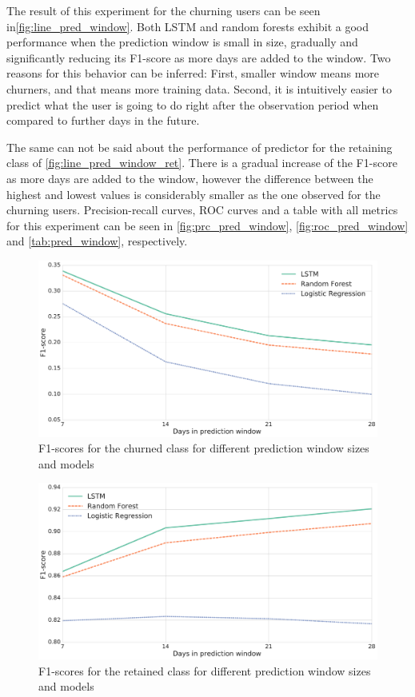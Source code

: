\documentclass{kththesis}
\begin{document}
The result of this experiment for the churning users can be seen in\autoref{fig:line_pred_window}. Both LSTM and random forests exhibit a good performance when the prediction window is small in size, gradually and significantly reducing its F1-score as more days are added to the window. Two reasons for this behavior can be inferred: First, smaller window means more churners, and that means more training data. Second, it is intuitively easier to predict what the user is going to do right after the observation period when compared to further days in the future. 

The same can not be said about the performance of predictor for the retaining class of \autoref{fig:line_pred_window_ret}. There is a gradual increase of the F1-score as more days are added to the window, however the difference between the highest and lowest values is considerably smaller as the one observed for the churning users. Precision-recall curves, ROC curves and a table with all metrics for this experiment can be seen in \autoref{fig:prc_pred_window}, \autoref{fig:roc_pred_window} and \autoref{tab:pred_window}, respectively.


\begin{figure}
    \centering
    \includegraphics[width=1.0\textwidth,keepaspectratio]{figures/line_pred_window.pdf}
    \caption{F1-scores for the churned class for different prediction window sizes and models}
    \label{fig:line_pred_window}
\end{figure}

\begin{figure}
    \centering
    \includegraphics[width=1.0\textwidth,keepaspectratio]{figures/line_pred_window_retained.pdf}
    \caption{F1-scores for the retained class for different prediction window sizes and models}
    \label{fig:line_pred_window_ret}
\end{figure}
\end{document}
